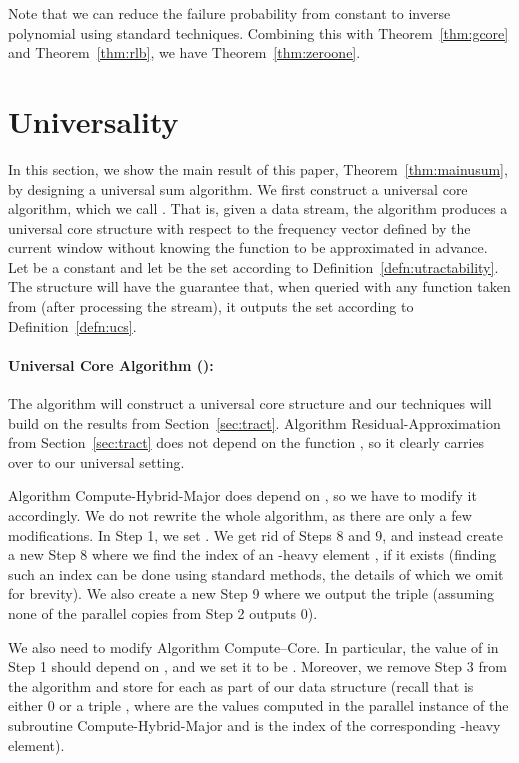 \documentclass[11pt]{article}
\begin{document}
\noindent Note that we can reduce the failure probability from constant to inverse polynomial using standard techniques.
Combining this with Theorem~\ref{thm:gcore} and Theorem~\ref{thm:rlb}, we have Theorem~\ref{thm:zeroone}.

\section{Universality}\label{sec:universality}

In this section, we show the main result of this paper, Theorem~\ref{thm:mainusum},
by designing a universal sum algorithm.  We first construct a universal core algorithm, which we call .
That is, given a data stream,
the algorithm produces a universal core structure with respect to the frequency vector 
defined by the current window  without knowing the function  to be approximated in advance.  Let
 be a constant and let  be the set according to Definition~\ref{defn:utractability}.
The structure will have the guarantee that, when queried with any function  taken from  (after
processing the stream), it outputs the set  according to Definition~\ref{defn:ucs}.


\paragraph{Universal Core Algorithm ():} The algorithm will construct a universal core structure
 and our techniques will build on the results from Section~\ref{sec:tract}.
Algorithm Residual-Approximation from Section~\ref{sec:tract} does not depend on the function ,
so it clearly carries over to our universal setting.

Algorithm Compute-Hybrid-Major does depend on , so we have to modify it accordingly.
We do not rewrite the whole algorithm, as there are only a few modifications.  In Step 1,
we set .  We get rid of Steps 8 and 9, and instead create a new
Step 8 where we find the index  of an -heavy element , if it exists (finding
such an index can be done using standard methods, the details of which we omit
for brevity).  We also create a new Step 9 where we output the triple  (assuming none of the parallel
copies from Step 2 outputs 0).

We also need to modify Algorithm Compute--Core.  In particular, the value
of  in Step 1 should depend on , and we set it to be .  Moreover,
we remove Step 3 from the algorithm and store  for each  as part of our
data structure  (recall that  is either 0 or a triple , where  are the values
computed in the  parallel instance of the subroutine Compute-Hybrid-Major and  is the index
of the corresponding -heavy element).
\end{document}
